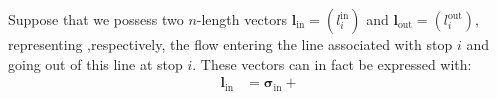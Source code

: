 \documentclass[11p]{article}
\begin{document}
Suppose that we possess two $n$-length vectors $\mathbf{l}_\text{in} = (l^\text{in}_i)$ and $\mathbf{l}_\text{out} = (l^\text{out}_i)$, representing ,respectively, the flow entering the line associated with stop $i$ and going out of this line at stop $i$. These vectors can in fact be expressed with: 
\begin{align}
\mathbf{l}_\text{in} &= \bm{\sigma}_\text{in} + 
\end{align}
\end{document}
